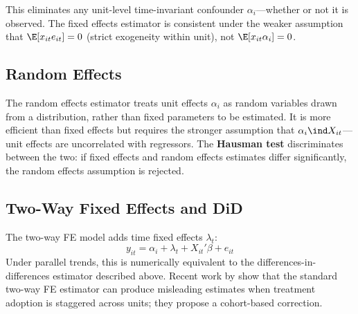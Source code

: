 This eliminates any unit-level time-invariant confounder
$\alpha_i$---whether or not it is observed. The fixed effects estimator is
consistent under the weaker assumption that $\E[x_{it}e_{it}] = 0$ (strict
exogeneity within unit), not $\E[x_{it}\alpha_i] = 0$.

\subsection{Random Effects}

The random effects estimator treats unit effects $\alpha_i$ as random
variables drawn from a distribution, rather than fixed parameters to be
estimated. It is more efficient than fixed effects but requires the stronger
assumption that $\alpha_i \ind X_{it}$---unit effects are uncorrelated with
regressors. The \textbf{Hausman test} discriminates between the two:
if fixed effects and random effects estimates differ significantly, the random
effects assumption is rejected.

\subsection{Two-Way Fixed Effects and DiD}

The two-way FE model adds time fixed effects $\lambda_t$:
\begin{equation}
  y_{it} = \alpha_i + \lambda_t + X_{it}'\beta + e_{it}
\end{equation}
Under parallel trends, this is numerically equivalent to the
differences-in-differences estimator described above. Recent work by
\citet{Callaway2021} show that the standard two-way FE estimator can produce
misleading estimates when treatment adoption is staggered across units; they
propose a cohort-based correction.


\renewcommand\bibname{Further reading}
\begin{subappendices}


\end{subappendices}
